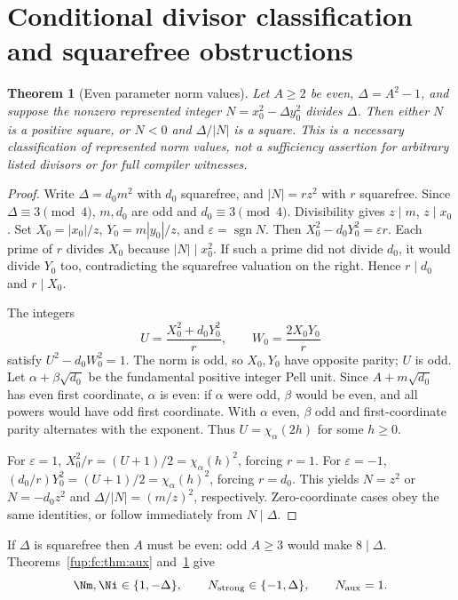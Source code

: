\documentclass[11pt,letterpaper]{article}
\newtheorem{theorem}{Theorem}[section]
\theoremstyle{definition}\newtheorem{definition}[theorem]{Definition}
\theoremstyle{remark}\newtheorem{remark}[theorem]{Remark}
\newcommand{\D}{\Delta}
\newcommand{\ch}[2]{\chi_{#1}(#2)}\newcommand{\ps}[2]{\psi_{#1}(#2)}
\newcommand{\Na}{N_{\mathrm{aux}}}\newcommand{\Nk}{N_{\mathrm{index}}}\newcommand{\Nt}{N_{\mathrm{transport}}}
\newcommand{\Ns}{N_{\mathrm{strong}}}
\begin{document}
\section{Conditional divisor classification and squarefree obstructions}
\label{fup:fc:sec:squarefree}
\begin{theorem}[Even parameter norm values]\label{fup:fc:thm:even}
Let $A\ge2$ be even, $\D=A^2-1$, and suppose the nonzero represented
integer $N=x_0^2-\D y_0^2$ divides $\D$. Then either $N$ is a positive
square, or $N<0$ and $\D/|N|$ is a square. This is a necessary
classification of represented norm values, not a sufficiency assertion
for arbitrary listed divisors or for full compiler witnesses.
\end{theorem}
\begin{proof}
Write $\D=d_0m^2$ with $d_0$ squarefree, and $|N|=rz^2$ with $r$
squarefree. Since $\D\equiv3\pmod4$, $m,d_0$ are odd and
$d_0\equiv3\pmod4$. Divisibility gives $z\mid m$, $z\mid x_0$.
Set $X_0=|x_0|/z$, $Y_0=m|y_0|/z$, and $\varepsilon=\operatorname{sgn}N$.
Then $X_0^2-d_0Y_0^2=\varepsilon r$.
Each prime of $r$ divides $X_0$ because $|N|\mid x_0^2$. If such a prime
did not divide $d_0$, it would divide $Y_0$ too, contradicting the
squarefree valuation on the right. Hence $r\mid d_0$ and $r\mid X_0$.

The integers
\[
 U=\frac{X_0^2+d_0Y_0^2}{r},\qquad W_0=\frac{2X_0Y_0}{r}
\]
satisfy $U^2-d_0W_0^2=1$. The norm is odd, so $X_0,Y_0$ have opposite
parity; $U$ is odd. Let $\alpha+\beta\sqrt{d_0}$ be the fundamental
positive integer Pell unit. Since $A+m\sqrt{d_0}$ has even first
coordinate, $\alpha$ is even: if $\alpha$ were odd, $\beta$ would be
even, and all powers would have odd first coordinate. With $\alpha$ even,
$\beta$ odd and first-coordinate parity alternates with the exponent.
Thus $U=\ch\alpha{2h}$ for some $h\ge0$.

For $\varepsilon=1$,
$X_0^2/r=(U+1)/2=\ch\alpha h^2$, forcing $r=1$.
For $\varepsilon=-1$,
$(d_0/r)Y_0^2=(U+1)/2=\ch\alpha h^2$, forcing $r=d_0$.
This yields $N=z^2$ or $N=-d_0z^2$ and
$\D/|N|=(m/z)^2$, respectively. Zero-coordinate cases obey the same
identities, or follow immediately from $N\mid\D$.
\end{proof}

If $\D$ is squarefree then $A$ must be even: odd $A\ge3$ would make
$8\mid\D$. Theorems~\ref{fup:fc:thm:aux} and~\ref{fup:fc:thm:even} give
\begin{equation}
 \Nm,\Ni\in\{1,-\D\},\qquad\Ns\in\{-1,\D\},\qquad\Na=1.\label{fup:fc:eq:squarefreevalues}
\end{equation}
\end{document}
